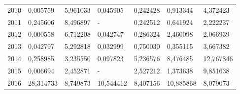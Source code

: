 \begin{table}
\begin{tabular}{p{1cm}p{2cm}p{2cm}p{2cm}p{2cm}p{2cm}p{2cm}}
 2010 &                         0,005759 &                     5,961033 &  0,045905 &                   0,242428 &                                  0,913344 &          4,372423 \\
 2011 &                         0,245606 &                     8,496897 &         - &                   0,242512 &                                  0,641924 &          2,222237 \\
 2012 &                         0,000558 &                     6,712208 &  0,042747 &                   0,286324 &                                  2,460098 &          2,066939 \\
 2013 &                         0,042797 &                     5,292818 &  0,032999 &                   0,750030 &                                  0,355115 &          3,667382 \\
 2014 &                         0,258985 &                     3,235550 &  0,097823 &                   5,236576 &                                  8,476485 &         12,767846 \\
 2015 &                         0,006694 &                     2,452871 &         - &                   2,527212 &                                  1,373638 &          9,851638 \\
 2016 &                        28,314733 &                     8,749873 & 10,544412 &                   8,407156 &                                 10,885868 &          8,079073 \\
\bottomrule
\end{tabular}
\end{table}
